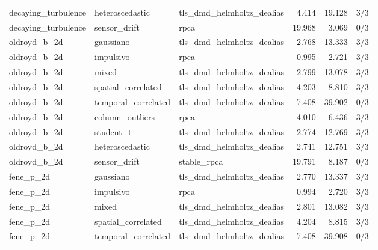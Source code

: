 {\begin{longtable}{p{}p{}p{}rrr}
decaying\_\allowbreak turbulence & heteroscedastic & tls\_\allowbreak dmd\_\allowbreak helmholtz\_\allowbreak dealias & 4.414 & 19.128 & 3/3 \\
decaying\_\allowbreak turbulence & sensor\_\allowbreak drift & rpca & 19.968 & 3.069 & 0/3 \\
oldroyd\_\allowbreak b\_\allowbreak 2d & gaussiano & tls\_\allowbreak dmd\_\allowbreak helmholtz\_\allowbreak dealias & 2.768 & 13.333 & 3/3 \\
oldroyd\_\allowbreak b\_\allowbreak 2d & impulsivo & rpca & 0.995 & 2.721 & 3/3 \\
oldroyd\_\allowbreak b\_\allowbreak 2d & mixed & tls\_\allowbreak dmd\_\allowbreak helmholtz\_\allowbreak dealias & 2.799 & 13.078 & 3/3 \\
oldroyd\_\allowbreak b\_\allowbreak 2d & spatial\_\allowbreak correlated & tls\_\allowbreak dmd\_\allowbreak helmholtz\_\allowbreak dealias & 4.203 & 8.810 & 3/3 \\
oldroyd\_\allowbreak b\_\allowbreak 2d & temporal\_\allowbreak correlated & tls\_\allowbreak dmd\_\allowbreak helmholtz\_\allowbreak dealias & 7.408 & 39.902 & 0/3 \\
oldroyd\_\allowbreak b\_\allowbreak 2d & column\_\allowbreak outliers & rpca & 4.010 & 6.436 & 3/3 \\
oldroyd\_\allowbreak b\_\allowbreak 2d & student\_\allowbreak t & tls\_\allowbreak dmd\_\allowbreak helmholtz\_\allowbreak dealias & 2.774 & 12.769 & 3/3 \\
oldroyd\_\allowbreak b\_\allowbreak 2d & heteroscedastic & tls\_\allowbreak dmd\_\allowbreak helmholtz\_\allowbreak dealias & 2.741 & 12.751 & 3/3 \\
oldroyd\_\allowbreak b\_\allowbreak 2d & sensor\_\allowbreak drift & stable\_\allowbreak rpca & 19.791 & 8.187 & 0/3 \\
fene\_\allowbreak p\_\allowbreak 2d & gaussiano & tls\_\allowbreak dmd\_\allowbreak helmholtz\_\allowbreak dealias & 2.770 & 13.337 & 3/3 \\
fene\_\allowbreak p\_\allowbreak 2d & impulsivo & rpca & 0.994 & 2.720 & 3/3 \\
fene\_\allowbreak p\_\allowbreak 2d & mixed & tls\_\allowbreak dmd\_\allowbreak helmholtz\_\allowbreak dealias & 2.801 & 13.082 & 3/3 \\
fene\_\allowbreak p\_\allowbreak 2d & spatial\_\allowbreak correlated & tls\_\allowbreak dmd\_\allowbreak helmholtz\_\allowbreak dealias & 4.204 & 8.815 & 3/3 \\
fene\_\allowbreak p\_\allowbreak 2d & temporal\_\allowbreak correlated & tls\_\allowbreak dmd\_\allowbreak helmholtz\_\allowbreak dealias & 7.408 & 39.908 & 0/3 \\

\end{longtable}}
